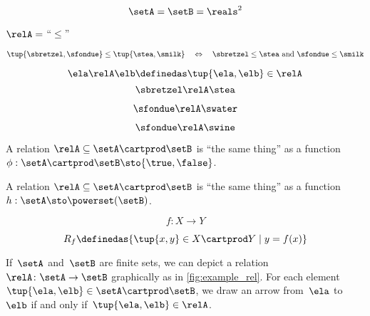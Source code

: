 {\begin{forslides}
		\begin{equation}
			\setA = \setB = \reals^2 \label{eq:slides-12}
		\end{equation}

		\begin{center}
			$\relA =$ ``$\leq$''  \label{eq:slides-13}
		\end{center}

		\begin{equation}
			\tup{\sbretzel, \sfondue} \leq \tup{\stea, \smilk} \quad \Leftrightarrow \quad \sbretzel \leq \stea \text{ and } \sfondue \leq \smilk \label{eq:slides-14}
		\end{equation}

		\begin{equation}
			\ela \relA \elb \definedas \tup{\ela, \elb} \in \relA  \label{eq:slides-15}
		\end{equation}
		\begin{equation}
			\sbretzel \relA \stea \label{eq:slides-16}
		\end{equation}

		\begin{equation}
			\sfondue \relA \swater \label{eq:slides-17}
		\end{equation}

		\begin{equation}
			\sfondue \relA \swine \label{eq:slides-18}
		\end{equation}

		A relation $\relA \subseteq \setA \cartprod \setB$ is ``the same thing'' as a function $\phi : \setA \cartprod \setB \sto \{\true, \false\}$.

		A relation $\relA \subseteq \setA \cartprod \setB$ is ``the same thing'' as a function $h : \setA  \sto \powerset (\setB)$.

		\begin{equation}
			f : X \to Y
		\end{equation}

		\begin{equation}
			R_f \definedas \{ \tup{x, y} \in X \cartprod Y \mid y = f(x) \}
		\end{equation}

	\end{forslides}
}

If~$\setA$ and~$\setB$ are finite sets, we can depict a relation~$\relA \colon \setA \to \setB$ graphically as in \cref{fig:example_rel}.
For each element~$\tup{\ela,\elb} \in \setA \cartprod \setB$, we draw an arrow from~$\ela$ to~$\elb$ if and only if~$\tup{\ela,\elb} \in \relA$.

